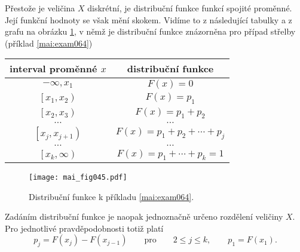 
    Přestože je veličina \(X\) diskrétní, je distribuční funkce funkcí spojité proměnné. Její 
    funkční hodnoty se však mění skokem. Vidíme to z následující tabulky a z grafu na obrázku 
    \ref{mai:fig045}, v němž je distribuční funkce znázorněna pro případ střelby (příklad 
    \ref{mai:exam064})

    \begin{table}[ht!]
      \centering
      \begin{tabular}{c|c}
        \textbf{interval proměnné} \(x\)  &  \textbf{distribuční funkce}             \\ \hline
            \(-\infty, x_1\)              &    \(F(x) = 0 \)                         \\
            \(\left[x_1, x_2\right)\)     &    \(F(x) = p_1 \)                       \\
            \(\left[x_2, x_3\right)\)     &    \(F(x) = p_1 + p_2 \)                 \\
                    \(\ldots\)            &       \(\ldots\)                         \\
            \(\left[x_j, x_{j+1}\right)\) &    \(F(x) = p_1 + p_2 + \cdots + p_j \)  \\
                   \(\ldots\)             &       \(\ldots\)                         \\
            \(\left[x_k, \infty\right)\)  &    \(F(x) = p_1 + \cdots + p_k =1 \)     \\ \hline
            \end{tabular}
    \end{table}

    \begin{figure}[ht!] %
      \centering
      \texttt{[image: mai\_fig045.pdf]}
      \caption{Distribuční funkce k příkladu \ref{mai:exam064}. \cite[s.~233]{Musilova2009MA1}}
      \label{mai:fig045}
    \end{figure}
    Zadáním distribuční funkce je naopak jednoznačně určeno rozdělení veličiny \(X\). Pro jednotlivé
    pravděpodobnosti totiž platí
    \begin{equation*}
      p_j = F(x_j) - F(x_{j-1})\qquad\text{pro}\qquad 2\leq j \leq k, \qquad p_1 = F(x_1).
    \end{equation*}
    
